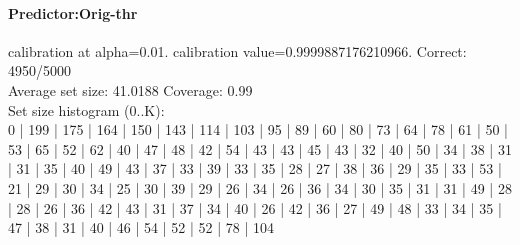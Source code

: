 \documentclass[parskip=half]{scrartcl}
\begin{document}
\paragraph{Predictor:Orig-thr} calibration at alpha=0.01. calibration value=0.9999887176210966. Correct: 4950/5000\\
Average set size: 41.0188   Coverage: 0.99\\
Set size histogram (0..K):\\
0 | 199 | 175 | 164 | 150 | 143 | 114 | 103 | 95 | 89 | 60 | 80 | 73 | 64 | 78 | 61 | 50 | 53 | 65 | 52 | 62 | 40 | 47 | 48 | 42 | 54 | 43 | 43 | 45 | 43 | 32 | 40 | 50 | 34 | 38 | 31 | 31 | 35 | 40 | 49 | 43 | 37 | 33 | 39 | 33 | 35 | 28 | 27 | 38 | 36 | 29 | 35 | 33 | 53 | 21 | 29 | 30 | 34 | 25 | 30 | 39 | 29 | 26 | 34 | 26 | 36 | 34 | 30 | 35 | 31 | 31 | 49 | 28 | 28 | 26 | 36 | 42 | 43 | 31 | 37 | 34 | 40 | 26 | 42 | 36 | 27 | 49 | 48 | 33 | 34 | 35 | 47 | 38 | 31 | 40 | 46 | 54 | 52 | 52 | 78 | 104\\
\end{document}
